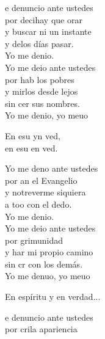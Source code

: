 \begin{cancion}%
	e denuncio ante ustedes \\
	por decihay que orar \\
	y  buscar ni un instante \\
	y delos días pasar. \\
	Yo me denio. \\
	\jump
	Yo me deio ante ustedes \\
	por hab los pobres \\
	y mirlos desde lejos \\
	sin cer sus nombres. \\
	Yo me denio, yo meuo\jump\\
	\begin{chorus}%
		En esu yn ved, \\
		en esu en ved.\jump\\
	\end{chorus}%
	Yo me deno ante ustedes \\
	por an el Evangelio \\
	y notreverme siquiera \\
	a too con el dedo. \\
	Yo me denio. \\
	\jump
	Yo me deio ante ustedes \\
	por grimunidad \\
	y har mi propio camino \\
	sin cr con los demás. \\
	Yo me denuo, yo meuo\jump\\
	\begin{chorus}%
	En espíritu y en verdad... \jump\\
	\end{chorus}%
	e denuncio ante ustedes \\
	por crila apariencia \\

\end{cancion}

